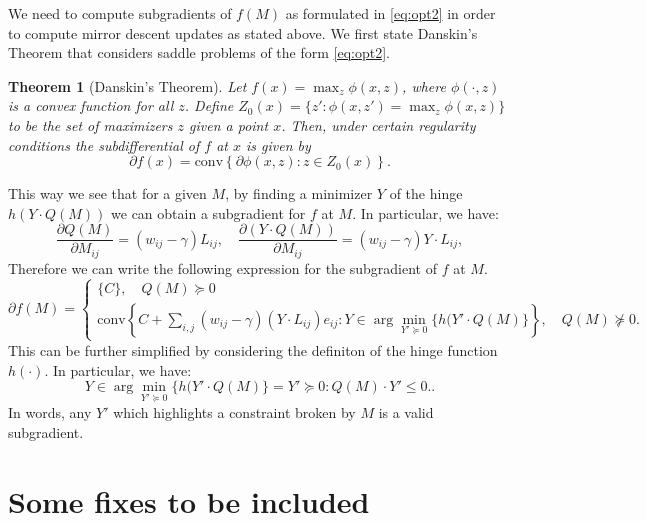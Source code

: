 \documentclass{article}
\newtheorem{theorem}{Theorem}[section]
\begin{document}
We need to compute subgradients of $f(M)$ as formulated in \eqref{eq:opt2} in order to compute mirror descent updates as stated above. We first state Danskin's Theorem \cite{danskin} that considers saddle problems of the form \eqref{eq:opt2}.

\begin{theorem}[Danskin's Theorem]
  Let $f(x) = \max_z \phi(x,z)$, where $\phi(\cdot,z)$ is a convex function for all $z$. Define $Z_0(x) = \{z' : \phi(x,z') = \max_z \phi(x,z)\}$ to be the set of maximizers $z$ given a point $x$. Then, under certain regularity conditions the subdifferential of $f$ at $x$ is given by
  \[ \partial f(x) = \mathrm{conv}\left\{ \partial \phi(x,z) : z \in Z_0(x)\right\}. \]
\end{theorem}

This way we see that for a given $M$, by finding a minimizer $Y$ of the hinge  $h(Y \cdot Q(M))$ we can obtain a subgradient for $f$ at $M$. In particular, we have:
\[ \frac{\partial Q(M)}{\partial M_{ij}} = (w_{ij} - \gamma) L_{ij}, \quad \frac{\partial (Y \cdot Q(M))}{\partial M_{ij}} = (w_{ij} - \gamma) Y \cdot L_{ij}, \]
Therefore we can write the following expression for the subgradient of $f$ at $M$.
\[ \partial f(M) = \begin{cases}
			\{C\}, \quad Q(M) \succeq 0 \\
			\mathrm{conv}\left\{C + \sum_{i,j} (w_{ij} - \gamma) \left(Y \cdot L_{ij} \right) e_{ij} :
			Y \in \arg\min_{Y' \succeq 0} \{h(Y' \cdot Q(M)\} \right\}, \quad Q(M) \not\succeq 0.
			\end{cases} \]
This can be further simplified by considering the definiton of the hinge function $h(\cdot).$
In particular, we have:
$$
Y \in \arg\min_{Y' \succeq 0} \{h(Y' \cdot Q(M)\} = {Y' \succeq 0 : Q(M) \cdot Y' \leq 0.}.
$$
In words, any $Y'$ which highlights a constraint broken by $M$ is a valid subgradient.

\section{Some fixes to be included}
\end{document}

